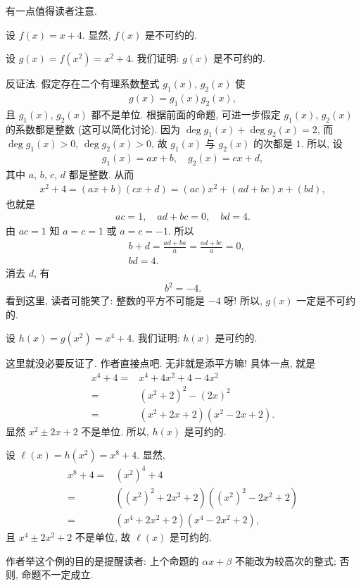 \begin{remark}
    有一点值得读者注意.

    设 $f(x) = x + 4$. 显然, $f(x)$ 是不可约的.

    设 $g(x) = f(x^2) = x^2 + 4$. 我们证明: $g(x)$ 是不可约的.

    反证法. 假定存在二个有理系数整式 $g_1 (x)$, $g_2 (x)$ 使
    \begin{align*}
        g(x) = g_1 (x) g_2 (x),
    \end{align*}
    且 $g_1 (x)$, $g_2 (x)$ 都不是单位. 根据前面的命题, 可进一步假定 $g_1 (x)$, $g_2 (x)$ 的系数都是整数 (这可以简化讨论). 因为 $\deg g_1 (x) + \deg g_2 (x) = 2$, 而 $\deg g_1 (x) > 0$, $\deg g_2 (x) > 0$, 故 $g_1 (x)$ 与 $g_2 (x)$ 的次都是 $1$. 所以, 设
    \begin{align*}
        g_1 (x) = ax + b, \quad g_2 (x) = cx + d,
    \end{align*}
    其中 $a$, $b$, $c$, $d$ 都是整数. 从而
    \begin{align*}
        x^2 + 4 = (ax + b)(cx + d) = (ac) x^2 + (ad + bc) x + (bd),
    \end{align*}
    也就是
    \begin{align*}
        ac = 1, \quad ad + bc = 0, \quad bd = 4.
    \end{align*}
    由 $ac = 1$ 知 $a = c = 1$ 或 $a = c = -1$. 所以
    \begin{align*}
         & b + d = \frac{ad + ba}{a} = \frac{ad + bc}{a} = 0, \\
         & bd = 4.
    \end{align*}
    消去 $d$, 有
    \begin{align*}
        b^2 = -4.
    \end{align*}
    看到这里, 读者可能笑了: 整数的平方不可能是 $-4$ 呀! 所以, $g(x)$ 一定是不可约的.

    设 $h(x) = g(x^2) = x^4 + 4$. 我们证明: $h(x)$ 是可约的.

    这里就没必要反证了. 作者直接点吧. 无非就是添平方嘛! 具体一点, 就是
    \begin{align*}
        x^4 + 4
        = {} & x^4 + 4x^2 + 4 - 4x^2          \\
        = {} & (x^2 + 2)^2 - (2x)^2           \\
        = {} & (x^2 + 2x + 2) (x^2 - 2x + 2).
    \end{align*}
    显然 $x^2 \pm 2x + 2$ 不是单位. 所以, $h(x)$ 是可约的.

    设 $\ell (x) = h(x^2) = x^8 + 4$. 显然,
    \begin{align*}
        x^8 + 4
        = {} & (x^2)^4 + 4                               \\
        = {} & ((x^2)^2 + 2x^2 + 2) ((x^2)^2 - 2x^2 + 2) \\
        = {} & (x^4 + 2x^2 + 2) (x^4 - 2x^2 + 2),
    \end{align*}
    且 $x^4 \pm 2x^2 + 2$ 不是单位, 故 $\ell (x)$ 是可约的.

    作者举这个例的目的是提醒读者: 上个命题的 $\alpha x + \beta$ 不能改为较高次的整式; 否则, 命题不一定成立.
\end{remark}

